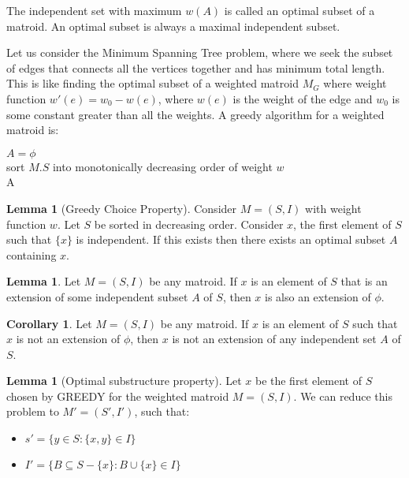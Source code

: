 \documentclass[12pt,letterpaper]{article}
\theoremstyle{definition}
\newtheorem{corollary}{Corollary}[theorem] %
\newtheorem{lemma}[theorem]{Lemma} %
\begin{document}
The independent set with maximum $w(A)$ is called an optimal subset of a matroid. An optimal subset is always a maximal independent subset.

Let us consider the Minimum Spanning Tree problem, where we seek the subset of edges that connects all the vertices together and has minimum total length. This is like finding the optimal subset of a weighted matroid $M_G$ where weight function $w'(e) = w_0 - w(e)$, where $w(e)$ is the weight of the edge and $w_0$ is some constant greater than all the weights. A greedy algorithm for a weighted matroid is:


\begin{algorithm}[H]
\SetAlgoLined
  $A = \phi$ \\
  sort $M.S$ into monotonically decreasing order of weight $w$  \\
  \Return A \\
  \caption{Greedy(M,w)}
\end{algorithm}

\begin{lemma}[Greedy Choice Property]
  Consider $M = (S,I)$ with weight function $w$. Let $S$ be sorted in decreasing order. Consider $x$, the first element of $S$ such that $\{x\} $ is independent. If this exists then there exists an optimal subset $A$ containing $x$.
\end{lemma}

\begin{lemma}
  Let $M = (S,I)$ be any matroid. If $x$ is an element of $S$ that is an extension of some independent subset $A$ of $S$, then $x$ is also an extension of $\phi$. 
\end{lemma}

\begin{corollary}
  Let $M = (S,I)$ be any matroid. If $x$ is an element of $S$ such that $x$ is not an extension of $\phi$, then $x$ is not an extension of any independent set $A$ of $S$. 
\end{corollary}

\begin{lemma}[Optimal substructure property]
  Let $x$ be the first element of $S$ chosen by GREEDY for the weighted matroid $M = (S,I)$. We can reduce this problem to $M' = (S',I')$, such that:
  \begin{itemize}
    \item $s' = \{y \in S : \{x,y\} \in I\}$
    \item $I' = \{B \subseteq S - \{x\} : B \cup \{x\} \in I\}$
  \end{itemize}
\end{lemma}
\end{document}
